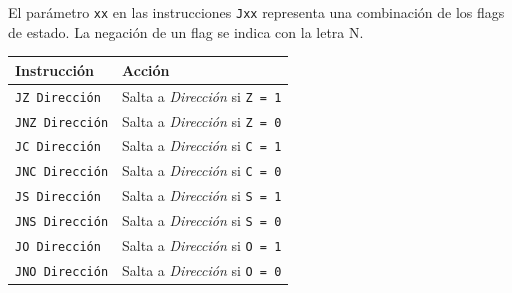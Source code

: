 \documentclass[12pt,oneside]{templates/unerthesis}
\begin{document}
\begin{table}[!h]
\centering
\caption{\label{tab:setreducido}Tabla de instrucciones de VonSim8}
\centering
{}
\end{table}

El parámetro \texttt{xx} en las instrucciones \texttt{Jxx} representa una combinación de los flags de estado. La negación de un flag se indica con la letra N.

\begin{longtable}[]{@{}ll@{}}
\toprule\noalign{}
Instrucción & Acción \\
\midrule\noalign{}
\endhead
\bottomrule\noalign{}
\endlastfoot
\texttt{JZ\ Dirección} & Salta a \emph{Dirección} si \texttt{Z\ =\ 1} \\
\texttt{JNZ\ Dirección} & Salta a \emph{Dirección} si \texttt{Z\ =\ 0} \\
\texttt{JC\ Dirección} & Salta a \emph{Dirección} si \texttt{C\ =\ 1} \\
\texttt{JNC\ Dirección} & Salta a \emph{Dirección} si \texttt{C\ =\ 0} \\
\texttt{JS\ Dirección} & Salta a \emph{Dirección} si \texttt{S\ =\ 1} \\
\texttt{JNS\ Dirección} & Salta a \emph{Dirección} si \texttt{S\ =\ 0} \\
\texttt{JO\ Dirección} & Salta a \emph{Dirección} si \texttt{O\ =\ 1} \\
\texttt{JNO\ Dirección} & Salta a \emph{Dirección} si \texttt{O\ =\ 0} \\
\end{longtable}
\end{document}
